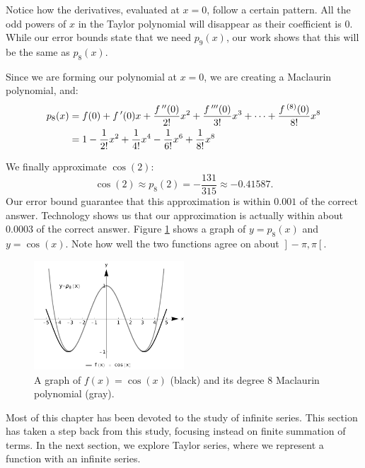 \begin{example}
Notice how the derivatives, evaluated at $x=0$, follow a certain pattern. All the odd powers of $x$ in the Taylor polynomial will disappear as their coefficient is 0. While our error bounds state that we need $p_9(x)$, our work shows that this will be the same as $p_8(x)$. 

Since we are forming our polynomial at $x=0$, we are creating a Maclaurin polynomial, and:
\begin{align*}
p_8(x) &= f(0) + f\,'(0)x + \frac{f\,''(0)}{2!}x^2 + \frac{f\,'''(0)}{3!}x^3 + \cdots +\frac{f\,^{(8)}(0)}{8!}x^8\\
		&=  1-\frac{1}{2!}x^2+\frac{1}{4!}x^4-\frac{1}{6!}x^6+\frac{1}{8!}x^8
\end{align*}

We finally approximate $\cos(2)$:
$$\cos(2) \approx p_8(2) = -\frac{131}{315} \approx -0.41587.$$ Our error bound guarantee that this approximation is within $0.001$ of the correct answer. Technology shows us that our approximation is actually within about $0.0003$ of the correct answer.
Figure \ref{fig_series_15} shows a graph of $y=p_8(x)$ and $y=\cos(x)$. Note how well the two functions agree on about $\left.\right]-\pi,\pi\left[\right.$.


\begin{figure}[H]
	\begin{center}
			\includegraphics[width=0.5\textwidth]{fig_series_15}
	\caption{A graph of $f(x)= \cos(x)$ (black) and its degree 8 Maclaurin polynomial (gray).}
	\label{fig_series_15}
	\end{center}
\end{figure}

\end{example}


Most of this chapter has been devoted to the study of infinite series. This section has taken a step back from this study, focusing instead on finite summation of terms. In the next section, we explore Taylor series, where we represent a function with an infinite series.

